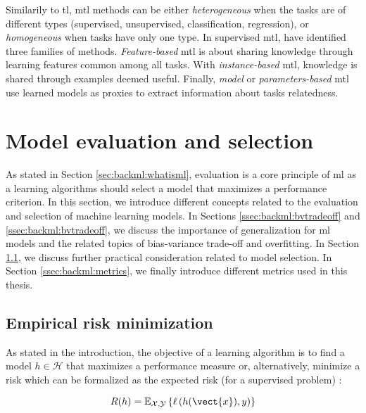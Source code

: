Similarily to \acrlong{tl}, \acrlong{mtl} methods can be either \textit{heterogeneous} when the tasks are of different types (\eg supervised, unsupervised, classification, regression), or \textit{homogeneous} when tasks have only one type. In supervised \acrlong{mtl}, \parencite{zhang2017survey} have identified three families of methods. \textit{Feature-based} \acrlong{mtl} is about sharing knowledge through learning features common among all tasks. With \textit{instance-based} \acrlong{mtl}, knowledge is shared through examples deemed useful. Finally, \textit{model} or \textit{parameters-based} \acrlong{mtl} use learned models as proxies to extract information about tasks relatedness.

\section{Model evaluation and selection}

As stated in Section \ref{sec:backml:whatisml}, evaluation is a core principle of \acrlong{ml} as a learning algorithms should select a model that maximizes a performance criterion. In this section, we introduce different concepts related to the evaluation and selection of machine learning models. In Sections \ref{ssec:backml:bvtradeoff} and \ref{ssec:backml:bvtradeoff}, we discuss the importance of generalization for \acrlong{ml} models and the related topics of bias-variance trade-off and overfitting. In Section \ref{ssec:backml:modelselection}, we discuss further practical consideration related to model selection. In Section \ref{ssec:backml:metrics}, we finally introduce different metrics used in this thesis. 


\subsection{Empirical risk minimization}
\label{ssec:backml:modelselection}
As stated in the introduction, the objective of a learning algorithm is to find a model $h \in \mathcal{H}$ that maximizes a performance measure or, alternatively, minimize a risk which can be formalized as the expected risk (for a supervised problem) \parencite{vapnik1992principles}:

\begin{equation}
\label{eqn:backml:expriskmin}
R(h) = \mathbb{E}_{\mathcal{X},\mathcal{Y}}\left\{\ell\left(h(\vect{x}), y\right)\right\}
\end{equation}

